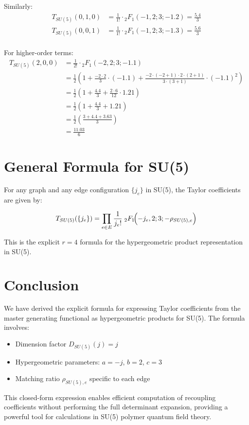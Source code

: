 \documentclass[11pt]{article}
\begin{document}
Similarly:
\begin{align}
T_{SU(5)}(0,1,0) &= \frac{1}{1!} \cdot {}_2F_1(-1, 2; 3; -1.2) = \frac{5.4}{3} \\
T_{SU(5)}(0,0,1) &= \frac{1}{1!} \cdot {}_2F_1(-1, 2; 3; -1.3) = \frac{5.6}{3} \\
\end{align}

For higher-order terms:
\begin{align}
T_{SU(5)}(2,0,0) &= \frac{1}{2!} \cdot {}_2F_1(-2, 2; 3; -1.1) \\
&= \frac{1}{2} \left(1 + \frac{-2 \cdot 2}{3} \cdot (-1.1) + \frac{-2 \cdot (-2+1) \cdot 2 \cdot (2+1)}{3 \cdot (3+1)} \cdot (-1.1)^2 \right) \\
&= \frac{1}{2} \left(1 + \frac{4.4}{3} + \frac{2 \cdot 6}{12} \cdot 1.21 \right) \\
&= \frac{1}{2} \left(1 + \frac{4.4}{3} + 1.21 \right) \\
&= \frac{1}{2} \left(\frac{3 + 4.4 + 3.63}{3} \right) \\
&= \frac{11.03}{6}
\end{align}

\section{General Formula for SU(5)}

For any graph and any edge configuration $\{j_e\}$ in SU(5), the Taylor coefficients are given by:

\begin{equation}
 T_{SU(5)}(\{j_e\}) = \prod_{e\in E}\frac{1}{j_e!}\; {}_2F_1\!\Bigl(-j_e, 2; 3; -\rho_{SU(5),e}\Bigr)
\end{equation}

This is the explicit $r=4$ formula for the hypergeometric product representation in SU(5).

\section{Conclusion}

We have derived the explicit formula for expressing Taylor coefficients from the master generating functional as hypergeometric products for SU(5). The formula involves:
\begin{itemize}
    \item Dimension factor $D_{SU(5)}(j) = j$
    \item Hypergeometric parameters: $a = -j$, $b = 2$, $c = 3$
    \item Matching ratio $\rho_{SU(5),e}$ specific to each edge
\end{itemize}

This closed-form expression enables efficient computation of recoupling coefficients without performing the full determinant expansion, providing a powerful tool for calculations in SU(5) polymer quantum field theory.
\end{document}
